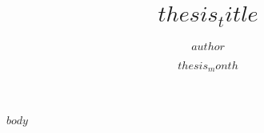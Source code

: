 \documentclass[12pt]{article}
\title{$thesis_title$}
\author{$author$}
\date{$thesis_month$}{$thesis_year$}
\begin{document}
\createtitlepage
\createsignaturepage

\createcopyrightpage

\begin{abstract}
\normalsize

\end{abstract}

\begin{aknowledgements}
\normalsize

\end{aknowledgements}

\tableofcontents 

\listoftables

\listoffigures

\begin{thesis}

$body$

\end{thesis}
\end{document}
